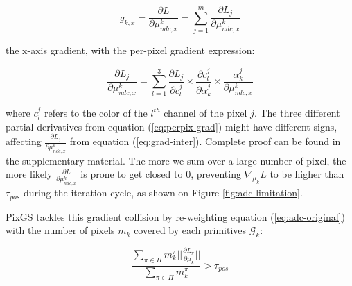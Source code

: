\begin{equation}
\label{eq:grad-inter}
    g_{k,x} = \frac{\partial L}{\partial \mu^{k}_{ndc,x}} = \sum \limits_{j=1}^{m} \frac{\partial L_{j}}{\partial \mu^{k}_{ndc,x}} 
\end{equation}



the x-axis gradient, with the per-pixel gradient expression: 

\begin{equation}
\label{eq:perpix-grad}
\frac{\partial L_{j}}{\partial \mu^{k}_{ndc,x}} = \sum \limits_{l=1}^{3} \frac{\partial L_{j}}{\partial c_{l}^{j}}\times \frac{\partial c_{l}^{j}}{\partial \alpha_{k}^{j}} \times \frac{\alpha_{k}^{j}}{\partial \mu^{k}_{ndc,x} }
\end{equation}

where $c_{l}^{j}$ refers to the color of the $l^{th}$ channel of the pixel $j$. The three different partial derivatives from equation (\ref{eq:perpix-grad}) might have different signs, affecting $\frac{\partial L_{j}}{\partial \mu^{k}_{ndc,x}}$  from equation (\ref{eq:grad-inter}). Complete proof can be found in the supplementary material. The more we sum over a large number of pixel, the more likely $\frac{\partial L}{\partial \mu^{k}_{ndc,x}}$ is prone to get closed to 0, preventing $\nabla_{\mu_{k}}L$ to be higher than $\tau_{pos}$ during the iteration cycle, as shown on Figure \ref{fig:adc-limitation}. 

PixGS tackles this gradient collision by re-weighting equation (\ref{eq:adc-original}) with the number of pixels $m_{k}$ covered by each primitives $\mathcal{G}_{k}$: 

\begin{equation}
\frac{\sum \limits_{\pi \in \Pi} m_{k}^{\pi} ||\frac{\partial L_{\pi}}{\partial \mu_{k}}||}{\sum \limits_{\pi \in \Pi}m_{k}^{\pi}} > \tau_{pos}
\label{eq:adc-original}
\end{equation}

